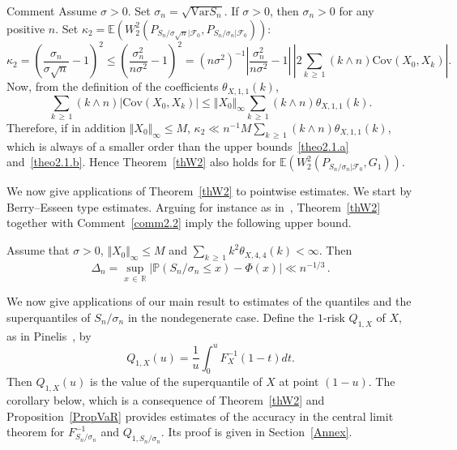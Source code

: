 \documentclass[10pt]{amsart}
\theoremstyle{definition}\newtheorem{defi}[theo]{Definition}\newtheorem{rema}[theo]{Remark}\newtheorem{exam}[theo]{Example}\newtheorem{exem}[theo]{Example}\newtheorem{nota}[theo]{Notation}
\newcommand{\bbE}{\mathbb{E}}
\newcommand{\clF}{\mathcal{F}}
\newcommand{\bbP}{\mathbb{P}}
\newcommand{\bbR}{\mathbb{R}}
\newcommand{\Cov}{\mathrm{Cov}}
\newcommand{\Var}{\mathrm{Var}}
\begin{document}
\begin{enonce}{Comment} \label{commentaftermainth}
Assume $\sigma >0$. Set $\sigma_n= \sqrt{ \Var S_n }$. If $\sigma>0$, then $\sigma_n>0$ for any positive $n$. Set
$\kappa_2 = \bbE (W_2^2 (P_{S_n / \sigma {\sqrt n} |\clF_0 }, P_{S_n / \sigma_n |\clF_0 }))$:
\[
\kappa_2 =
\left(\frac{\sigma_n}{\sigma \sqrt n} - 1 \right)^2 \leq \left (\frac{\sigma_n^2}{n\sigma^2} - 1 \right)^2 = \left(n\sigma^2\right)^{-1} \left| \frac{\sigma_n^2}{n\sigma^2} - 1 \right| \, \left| 2 \sum_{k\,\geq\,1} (k \wedge n) \Cov (X_0,X_k)\right|.
\]
Now, from the definition of the coefficients $ \theta_{X,1,1} (k)$,
\begin{equation}\label{UpperBoundCov1}
\sum_{k\, \geq\,1} (k \wedge n) | \Cov (X_0,X_k) |
\leq \Vert X_0 \Vert_{\infty} \sum_{k\,\geq\,1} (k \wedge n) \theta_{X,1, 1} (k).
\end{equation}
Therefore, if in addition $\Vert X_0 \Vert_{\infty} \leq M$, $\kappa_2 \ll n^{-1} M \sum_{k\,\geq\,1} (k \wedge n) \theta_{X,1, 1} (k)$, which is always of a smaller order than the upper bounds~\eqref{theo2.1.a} and~\eqref{theo2.1.b}. Hence Theorem~\ref{thW2} also holds for $\bbE (W_2^2 (P_{S_n / \sigma_n |\clF_0 }, G_{1}) ) $.
\end{enonce}

We now give applications of Theorem~\ref{thW2} to pointwise estimates. We start by Berry--Esseen type estimates. Arguing for instance as in~\cite[Remark~2.4]{DMR09}, Theorem~\ref{thW2} together with Comment~\ref{comm2.2} imply the following upper bound.

\begin{coro}\label{AppliBE}
Assume that $\sigma>0$, $\Vert X_0 \Vert_{\infty} \leq M$ and $\sum_{k\, \geq\,1} k^2 \theta_{X,4,4} (k) < \infty$. Then
\[
\Delta_{n} = \sup_{x\,\in\,\bbR}\left| \bbP (S_n/\sigma_n \leq x) - \Phi(x)\right|\ll n^{-1/3} \,.
\]
\end{coro}

We now give applications of our main result to estimates of the quantiles and the superquantiles of $S_n/\sigma_n$ in the nondegenerate case. Define the $1$-risk $Q_{1,X}$ of $X$, as in Pinelis~\cite{Pi14}, by
\begin{equation}\label{DefSuperQuantile}
Q_{1,X} (u) = \frac 1 u \int_0^u F_X^{-1} (1-t) dt.
\end{equation}
Then $Q_{1,X} (u)$ is the value of the superquantile of $X$ at point $(1-u)$. The corollary below, which is a consequence of Theorem~\ref{thW2} and Proposition~\ref{PropVaR} provides estimates of the accuracy in the central limit theorem for $F^{-1}_{S_n/\sigma_n}$ and $Q_{1,S_n/\sigma_n}$. Its proof is given in Section~\ref{Annex}.
\end{document}
